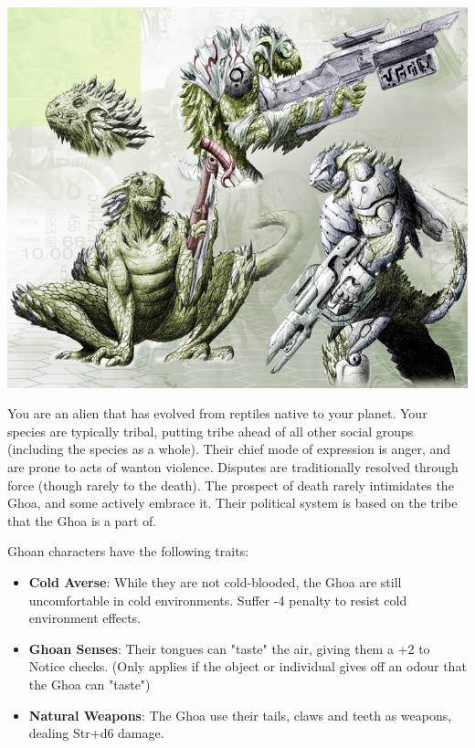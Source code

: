 \documentclass[10pt,twoside]{article}
\begin{document}
\begin{multicols}{2}
        \includegraphics[width=\linewidth]{alien_reptile_concept_by_xjager513-d3ba4g7.jpg}
        
        You are an alien that has evolved from reptiles native to your planet. Your species are typically tribal, putting tribe ahead of all other social groups (including the species as a whole). Their chief mode of expression is anger, and are prone to acts of wanton violence. Disputes are traditionally resolved through force (though rarely to the death). The prospect of death rarely intimidates the Ghoa, and some actively embrace it. Their political system is based on the tribe that the Ghoa is a part of. 
        
        Ghoan characters have the following traits:
        
        \begin{itemize}
            \item \textbf{Cold Averse}: While they are not cold-blooded, the Ghoa are still uncomfortable in cold environments. Suffer -4 penalty to resist cold environment effects.
            
            \item \textbf{Ghoan Senses}: Their tongues can "taste" the air, giving them a +2 to Notice checks. (Only applies if the object or individual gives off an odour that the Ghoa can "taste")
          
            \item \textbf{Natural Weapons}: The Ghoa use their tails, claws and teeth as weapons, dealing Str+d6 damage.
          

\end{itemize}
\end{multicols}
\end{document}
